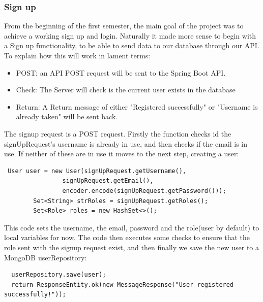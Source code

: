 \subsubsection{Sign up}
From the beginning of the first semester, the main goal of the project was to achieve a working sign up and login. Naturally it made more sense to begin with a Sign up functionality, to be able to send data to our database through our API. To explain how this will work in lament terms:
\begin{itemize}
    \item POST: an API POST request will be sent to the Spring Boot API.
    \item Check: The Server will check is the current user exists in the database
    \item Return: A Return message of either "Registered successfully" or "Username is already taken" will be sent back.
\end{itemize}
\par The signup request is a POST request. Firstly the function checks id the signUpRequest's username is already in use, and then checks if the email is in use. If neither of these are in use it moves to the next step, creating a user: \par
\begin{verbatim}
 User user = new User(signUpRequest.getUsername(),
                signUpRequest.getEmail(),
                encoder.encode(signUpRequest.getPassword()));
        Set<String> strRoles = signUpRequest.getRoles();
        Set<Role> roles = new HashSet<>();
\end{verbatim}
\par This code sets the username, the email, password and the role(user by default) to local variables for now. The code then executes some checks to ensure that the role sent with the signup request exist, and then finally we save the new user to a MongoDB userRepository: \par
\begin{verbatim}
  userRepository.save(user);
  return ResponseEntity.ok(new MessageResponse("User registered successfully!"));
\end{verbatim}
